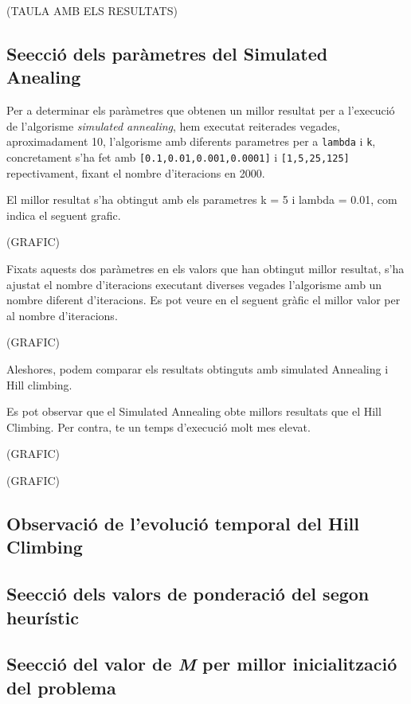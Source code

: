        (TAULA AMB ELS RESULTATS)



\subsection{Se\lgem ecció dels paràmetres del Simulated Anealing}
Per a determinar els paràmetres que obtenen un millor resultat per a l'execució de l'algorisme \emph{simulated annealing},
hem executat reiterades vegades, aproximadament 10, l'algorisme amb diferents parametres per a \texttt{lambda} i \texttt{k}, concretament s'ha fet amb
\texttt{[0.1,0.01,0.001,0.0001]} i \texttt{[1,5,25,125]} repectivament, fixant el nombre d'iteracions en 2000.

El millor resultat s'ha obtingut amb els parametres k = 5 i lambda = 0.01, com indica el seguent grafic.

(GRAFIC)

Fixats aquests dos paràmetres en els valors que han obtingut millor resultat, s'ha ajustat el nombre d'iteracions executant diverses 
vegades l'algorisme amb un nombre diferent d'iteracions. Es pot veure en el seguent gràfic el millor valor per al nombre d'iteracions.



(GRAFIC)

Aleshores, podem comparar els resultats obtinguts amb simulated Annealing i Hill climbing.

Es pot observar que el Simulated Annealing obte millors resultats que el Hill Climbing. Per contra, te un temps d'execució molt mes elevat.

(GRAFIC)

(GRAFIC)


\subsection{Observació de l'evolució temporal del Hill Climbing}

\subsection{Se\lgem ecció dels valors de ponderació del segon heurístic}

\subsection{Se\lgem ecció del valor de \emph{M} per millor inicialització del problema}